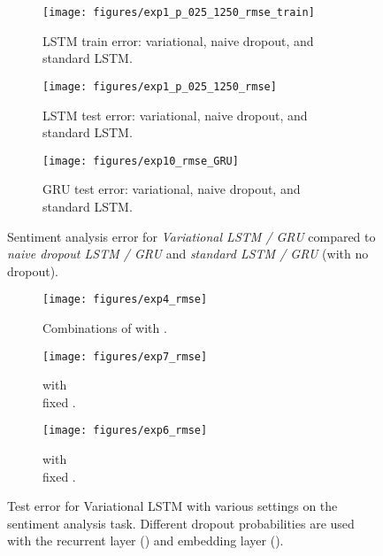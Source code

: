 \documentclass{article}
\theoremstyle{definition}
\begin{document}
\begin{figure*}[t!]
\captionsetup[subfigure]{justification=centering}
\begin{subfigure}[b]{0.32\linewidth}
\texttt{[image: figures/exp1\_p\_025\_1250\_rmse\_train]}

\caption{LSTM train error: variational, naive dropout, and standard LSTM.}
\label{fig:BLSTM-a}
\end{subfigure}
\begin{subfigure}[b]{0.32\linewidth}
\texttt{[image: figures/exp1\_p\_025\_1250\_rmse]}

\caption{LSTM test error: variational, naive dropout, and standard LSTM.}
\label{fig:BLSTM-b}
\end{subfigure}
\begin{subfigure}{0.32\linewidth}
\vspace{-38mm}
\texttt{[image: figures/exp10\_rmse\_GRU]}

\caption{GRU test error: variational, naive dropout, and standard LSTM.}
\label{fig:BGRU-a}
\end{subfigure}

\vspace{4mm}
\caption{
Sentiment analysis error for \textit{Variational LSTM / GRU} compared to \textit{naive dropout LSTM / GRU} and \textit{standard LSTM / GRU} (with no dropout).
}
\label{fig:BRNN}
\vspace{-4mm}
\end{figure*}



\begin{figure*}[b]
\captionsetup[subfigure]{justification=centering}
\begin{subfigure}{0.32\linewidth}
\texttt{[image: figures/exp4\_rmse]}

\caption{Combinations of  with .}
\label{fig:BRNN-combinations}
\end{subfigure}
\begin{subfigure}{0.32\linewidth}
\texttt{[image: figures/exp7\_rmse]}

\caption{ with \\
fixed .}
\label{fig:BRNN-funny1}
\end{subfigure}
\begin{subfigure}{0.32\linewidth}
\texttt{[image: figures/exp6\_rmse]}

\caption{ with \\
fixed .}
\label{fig:BRNN-funny3}
\end{subfigure}

\vspace{4mm}
\caption{Test error for Variational LSTM with various settings on the sentiment analysis task. Different dropout probabilities are used with the recurrent layer () and embedding layer ().}
\vspace{2mm}
\end{figure*}
\end{document}
